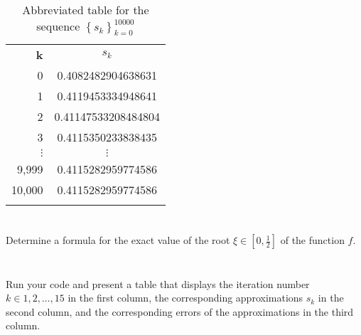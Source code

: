 \documentclass{article}
\begin{document}
\begin{table}[H]
    \centering
    \begin{tabular}{|r|c|}
        \Xhline{1 pt}
         \textbf{k}& \textbf{$s_k$}  \\
         \Xhline{1.5 pt}
         0 & 0.4082482904638631\\
         \Xhline{1 pt}
         1 & 0.4119453334948641\\
         \Xhline{1 pt}
         2 & 0.41147533208484804\\
         \Xhline{1 pt}
         3 & 0.4115350233838435\\
         \Xhline{1 pt}
         $\vdots$ & $\vdots$\\
          \Xhline{1 pt}
         9,999 & 0.4115282959774586\\
          \Xhline{1 pt}
         10,000 & 0.4115282959774586\\
         \Xhline{1 pt}
    \end{tabular}
    \caption{Abbreviated table for the sequence $\left\{ s_k\right\}_{k=0}^{10000}$}
    \label{tab:10sequence}
\end{table}


\section{}
Determine a formula for the exact value of the root $\xi \in \left[0,\frac{1}{2} \right]$ of the function $f$.
\vspace{10mm}


\section{}
Run your code and present a table that displays the iteration number $k \in {1,2,\dots,15}$ in the first column, the corresponding approximations $s_k$ in the second column, and the corresponding errors of the approximations in the third column.
\vspace{10mm}
\end{document}
